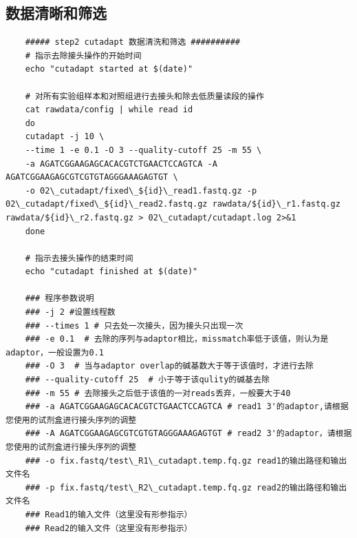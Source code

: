 \subsection{数据清晰和筛选}
\begin{lstlisting}
    ##### step2 cutadapt 数据清洗和筛选 ##########
    # 指示去除接头操作的开始时间
    echo "cutadapt started at $(date)"

    # 对所有实验组样本和对照组进行去接头和除去低质量读段的操作
    cat rawdata/config | while read id
    do
    cutadapt -j 10 \
    --time 1 -e 0.1 -O 3 --quality-cutoff 25 -m 55 \
    -a AGATCGGAAGAGCACACGTCTGAACTCCAGTCA -A AGATCGGAAGAGCGTCGTGTAGGGAAAGAGTGT \
    -o 02\_cutadapt/fixed\_${id}\_read1.fastq.gz -p 02\_cutadapt/fixed\_${id}\_read2.fastq.gz rawdata/${id}\_r1.fastq.gz rawdata/${id}\_r2.fastq.gz > 02\_cutadapt/cutadapt.log 2>&1
    done

    # 指示去接头操作的结束时间
    echo "cutadapt finished at $(date)"

    ### 程序参数说明
    ### -j 2 #设置线程数
    ### --times 1 # 只去处一次接头，因为接头只出现一次
    ### -e 0.1  # 去除的序列与adaptor相比，missmatch率低于该值，则认为是adaptor，一般设置为0.1 
    ### -O 3  # 当与adaptor overlap的碱基数大于等于该值时，才进行去除
    ### --quality-cutoff 25  # 小于等于该qulity的碱基去除
    ### -m 55 # 去除接头之后低于该值的一对reads丢弃，一般要大于40
    ### -a AGATCGGAAGAGCACACGTCTGAACTCCAGTCA # read1 3'的adaptor,请根据您使用的试剂盒进行接头序列的调整
    ### -A AGATCGGAAGAGCGTCGTGTAGGGAAAGAGTGT # read2 3'的adaptor，请根据您使用的试剂盒进行接头序列的调整
    ### -o fix.fastq/test\_R1\_cutadapt.temp.fq.gz read1的输出路径和输出文件名
    ### -p fix.fastq/test\_R2\_cutadapt.temp.fq.gz read2的输出路径和输出文件名
    ### Read1的输入文件（这里没有形参指示）
    ### Read2的输入文件（这里没有形参指示）
\end{lstlisting}

